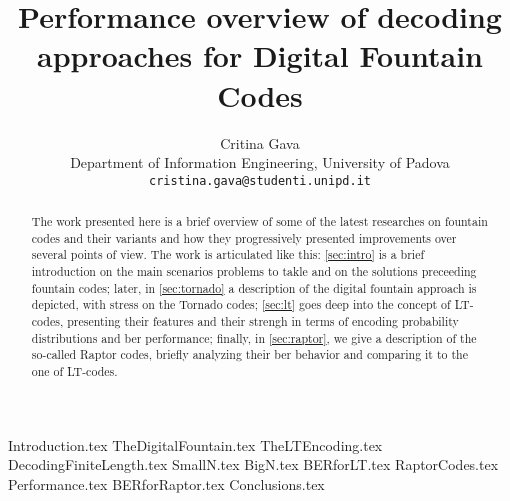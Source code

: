 \documentclass[12pt,a4paper]{article}
\newcommand{\email}[1]{\texttt{#1}}
\begin{document}
\begin{titlingpage}
\title{Performance overview of decoding approaches for Digital Fountain Codes}
\author{Critina Gava\\
Department of Information Engineering, University of Padova\\
\email{cristina.gava@studenti.unipd.it}}
\setlength{\droptitle}{3pt} %
\maketitle
\begin{abstract}
The work presented here is a brief overview of some of the latest researches on fountain codes and their variants and how they progressively presented improvements over several points of view. The work is articulated like this: \autoref{sec:intro} is a brief introduction on the main scenarios problems to takle and on the solutions preceeding fountain codes; later, in \autoref{sec:tornado} a description of the digital fountain approach is depicted, with stress on the Tornado codes; \autoref{sec:lt} goes deep into the concept of LT-codes, presenting their features and their strengh in terms of encoding probability distributions and \gls{ber} performance; finally, in \autoref{sec:raptor}, we give a description of the so-called Raptor codes, briefly analyzing their \gls{ber} behavior and comparing it to the one of LT-codes.
\end{abstract}
\end{titlingpage}

{Introduction.tex}
{TheDigitalFountain.tex}
{TheLTEncoding.tex}
{DecodingFiniteLength.tex}
{SmallN.tex}
{BigN.tex}
{BERforLT.tex}
{RaptorCodes.tex}
{Performance.tex}
{BERforRaptor.tex}
{Conclusions.tex}



\end{document}
